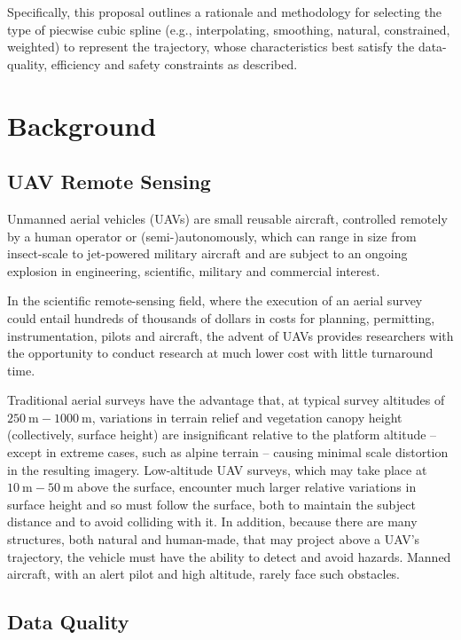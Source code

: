\documentclass[doc]{apa6}
\begin{document}
Specifically, this proposal outlines a rationale and methodology for selecting the type of piecwise cubic spline (e.g., interpolating, smoothing, natural, constrained, weighted) to represent the trajectory, whose characteristics best satisfy the data-quality, efficiency and safety constraints as described. 



\section{Background}

\subsection{UAV Remote Sensing}

Unmanned aerial vehicles (UAVs) are small reusable aircraft, controlled remotely by a human operator or (semi-)autonomously, which can range in size from insect-scale to jet-powered military aircraft \parencite{Avadhanula2002,Deng2003} and are subject to an ongoing explosion in engineering, scientific, military and commercial interest. 

In the scientific remote-sensing field, where the execution of an aerial survey could entail hundreds of thousands of dollars in costs for planning, permitting, instrumentation, pilots and aircraft, the advent of UAVs provides researchers with the opportunity to conduct research at much lower cost with little turnaround time. 

Traditional aerial surveys have the advantage that, at typical survey altitudes of $\SI{250}\m-\SI{1000}\m$, variations in terrain relief and vegetation canopy height (collectively, surface height) are insignificant relative to the platform altitude -- except in extreme cases, such as alpine terrain -- causing minimal scale distortion in the resulting imagery. Low-altitude UAV surveys, which may take place at $\SI{10}\m-\SI{50}\m$ above the surface, encounter much larger relative variations in surface height and so must follow the surface, both to maintain the subject distance and to avoid colliding with it. In addition, because there are many structures, both natural and human-made, that may project above a UAV's trajectory, the vehicle must have the ability to detect and avoid hazards. Manned aircraft, with an alert pilot and high altitude, rarely face such obstacles. 


\subsection{Data Quality}
\end{document}
